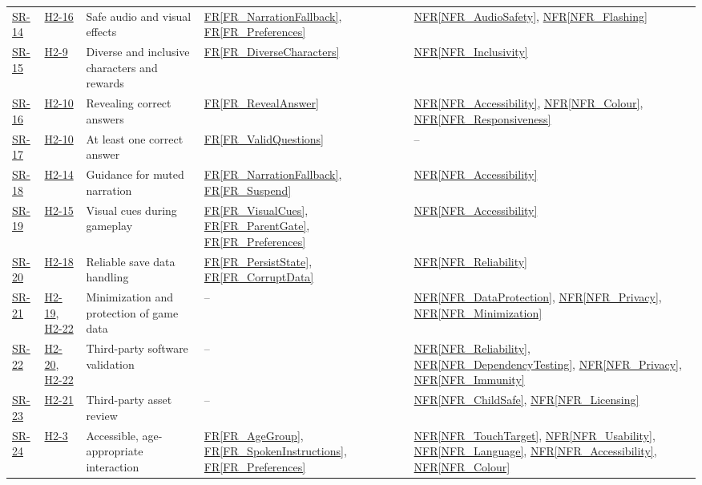 \documentclass[10pt]{article}
\newcommand{\rref}[1]{\hyperref[#1]{FR\ref*{#1}}}
\newcommand{\nfrref}[1]{\hyperref[#1]{NFR\ref*{#1}}}
\newcommand{\haurl}{https://team-hindsight.github.io/ophthamology-game/HazardAnalysis/HazardAnalysis.pdf}
\newcommand{\hasrref}[2]{\href{\haurl\#nameddest=sr:#1}{SR-#2}}
\newcommand{\hahazref}[2]{\href{\haurl\#nameddest=haz:#1}{H#2}}
\begin{document}
\begin{longtable}{p{} p{} >{\raggedright\arraybackslash}p{} >{\raggedright\arraybackslash}p{} >{\raggedright\arraybackslash}p{}}
\hasrref{SafeAudioVisuals}{14} & \hahazref{UnsafeAudioVisuals}{2-16} & Safe audio and visual effects & \rref{FR_NarrationFallback}, \rref{FR_Preferences} & \nfrref{NFR_AudioSafety}, \nfrref{NFR_Flashing} \\
\hasrref{CharacterDiversityInclusivity}{15} & \hahazref{DiverseCharacterLibrary}{2-9} & Diverse and inclusive characters and rewards & \rref{FR_DiverseCharacters} & \nfrref{NFR_Inclusivity} \\
\hasrref{CorrectAnswerReveal}{16} & \hahazref{CorrectAnswerReveal}{2-10} & Revealing correct answers & \rref{FR_RevealAnswer} & \nfrref{NFR_Accessibility}, \nfrref{NFR_Colour}, \nfrref{NFR_Responsiveness} \\
\hasrref{AtLeastOneCorrectAnswer}{17} & \hahazref{CorrectAnswerReveal}{2-10} & At least one correct answer & \rref{FR_ValidQuestions} & -- \\
\hasrref{NarrationMuted}{18} & \hahazref{NarrationDisabledSetting}{2-14} & Guidance for muted narration & \rref{FR_NarrationFallback}, \rref{FR_Suspend} & \nfrref{NFR_Accessibility} \\
\hasrref{VisualCuesSetting}{19} & \hahazref{VisualCuesDisabledSetting}{2-15} & Visual cues during gameplay & \rref{FR_VisualCues}, \rref{FR_ParentGate}, \rref{FR_Preferences} & \nfrref{NFR_Accessibility} \\
\hasrref{ReliableSaveData}{20} & \hahazref{SaveDataCorruption}{2-18} & Reliable save data handling & \rref{FR_PersistState}, \rref{FR_CorruptData} & \nfrref{NFR_Reliability} \\
\hasrref{MinimalSaveData}{21} & \hahazref{SaveDataPrivacy}{2-19}, \hahazref{UnexpectedDataTransmission}{2-22} & Minimization and protection of game data & -- & \nfrref{NFR_DataProtection}, \nfrref{NFR_Privacy}, \nfrref{NFR_Minimization} \\
\hasrref{ThirdPartyValidation}{22} & \hahazref{ThirdPartyFailure}{2-20}, \hahazref{UnexpectedDataTransmission}{2-22} & Third-party software validation & -- & \nfrref{NFR_Reliability}, \nfrref{NFR_DependencyTesting}, \nfrref{NFR_Privacy}, \nfrref{NFR_Immunity} \\
\hasrref{ThirdPartyAssetReview}{23} & \hahazref{ThirdPartyAssetContent}{2-21} & Third-party asset review & -- & \nfrref{NFR_ChildSafe}, \nfrref{NFR_Licensing} \\
\hasrref{AccessibleInteraction}{24} & \hahazref{InaccessibleInteraction}{2-3} & Accessible, age-appropriate interaction & \rref{FR_AgeGroup}, \rref{FR_SpokenInstructions}, \rref{FR_Preferences} & \nfrref{NFR_TouchTarget}, \nfrref{NFR_Usability}, \nfrref{NFR_Language}, \nfrref{NFR_Accessibility}, \nfrref{NFR_Colour} \\

\end{longtable}
\end{document}
